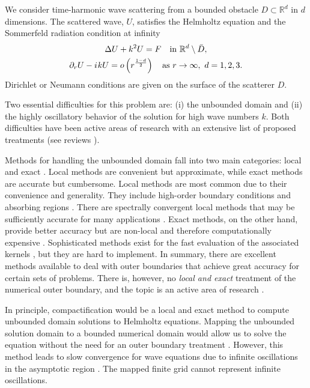 \documentclass[draft,onefignum,onetabnum]{siamart190516}
\newcommand{\iu}{{i\mkern1mu}}
\begin{document}
We consider time-harmonic wave scattering from a bounded obstacle $D \subset \mathbb{R}^d$ in $d$ dimensions. The scattered wave, $U$, satisfies the Helmholtz equation and the Sommerfeld radiation condition at infinity
\begin{equation}
	\label{eq:helm}
	\begin{gathered}
		\Delta U + k^2 U = F \quad \mathrm{in } \ \mathbb{R}^d\setminus \bar{D}, \\
		\partial_r U - \iu k U = o\left(r^{\frac{1-d}{2}}\right) \quad \mathrm{as} \ r\to\infty,\ d=1,2,3.
	\end{gathered}
\end{equation}
Dirichlet or Neumann conditions are given on the surface of the scatterer $D$.

Two essential difficulties for this problem are: (i) the unbounded domain and (ii) the highly oscillatory behavior of the solution for high wave numbers $k$. Both difficulties have been active areas of research with an extensive list of proposed treatments (see reviews \cite{TSYNKOV1998465, HagstromReview, engquist2003computational}).

Methods for handling the unbounded domain fall into two main categories: local and exact \cite{TSYNKOV1998465, HagstromReview, givoli2013numerical}. Local methods are convenient but approximate, while exact methods are accurate but cumbersome. Local methods are most common due to their convenience and generality. They include high-order boundary conditions \cite{EngquistMajda77, BaylissTurkel80} and absorbing regions \cite{israeli1981approximation, BERENGER1994185}. There are spectrally convergent local methods that may be sufficiently accurate for many applications \cite{hagstrom2009complete}. Exact methods, on the other hand, provide better accuracy but are non-local and therefore computationally expensive \cite{keller1989exact, GROTE1998327, grote1996nonreflecting}. Sophisticated methods exist for the fast evaluation of the associated kernels \cite{alpert2000rapid}, but they are hard to implement. In summary, there are excellent methods available to deal with outer boundaries that achieve great accuracy for certain sets of problems. There is, however, no {\it local and exact} treatment of the numerical outer boundary, and the topic is an active area of research \cite{9196168, kirby2020finite, papadimitropoulos2020double, petropavlovsky2020numerical, duhamel2020computation}.


In principle, compactification would be a local and exact method to compute unbounded domain solutions to Helmholtz equations. Mapping the unbounded solution domain to a bounded numerical domain would allow us to solve the equation without the need for an outer boundary treatment \cite{GroschOrszag77, boyd1982optimization, shen2009some}. However, this method leads to slow convergence for wave equations due to infinite oscillations in the asymptotic region \cite{GroschOrszag77, shen2014approximations}. The mapped finite grid cannot represent infinite oscillations.
\end{document}
